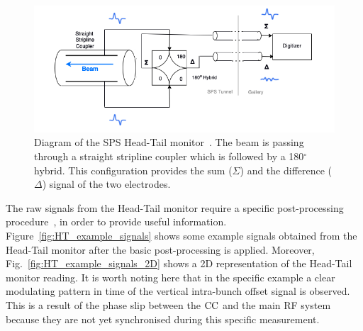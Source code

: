 \begin{figure}[h]%
   \centering         
   \includegraphics[width=1.0\textwidth]{images/Ch4/HT_monitor_sketch.png}
       \caption{Diagram of the SPS Head-Tail monitor~\cite{Levens:2313358}. The beam is passing through a straight stripline coupler which is followed by a 180$^\circ$ hybrid. This configuration provides the sum ($\Sigma$) and the difference ($\Delta$) signal of the two electrodes.} %
       \label{fig:SPS_HT_diagram}
\end{figure}

The raw signals from the Head-Tail monitor require a specific post-processing procedure~\cite{Levens:2313358}, in order to provide useful information. Figure~\ref{fig:HT_example_signals} shows some example signals obtained from the Head-Tail monitor after the basic post-processing is applied. Moreover, Fig.~\ref{fig:HT_example_signals_2D} shows a 2D representation of the Head-Tail monitor reading. It is worth noting here that in the specific example a clear modulating pattern in time of the vertical intra-bunch offset signal is observed. This is a result of the phase slip between the ${\mathrm{CC}}$ and the main RF system because they are not yet synchronised during this specific measurement. 

